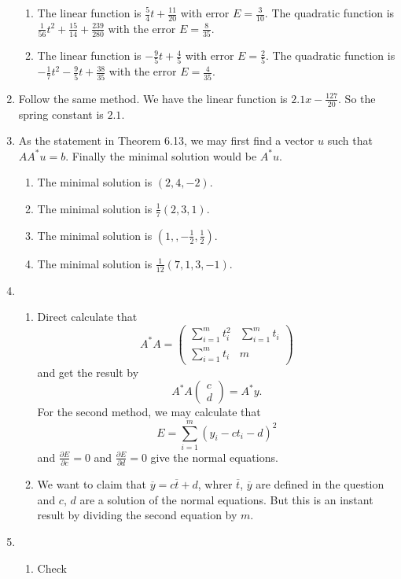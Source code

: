 \begin{enumerate}
\begin{enumerate}
\item The linear function is $\frac{5}{4}t+\frac{11}{20}$ with error $E=\frac{3}{10}$. The quadratic function is $\frac{1}{56}t^2+\frac{15}{14}+\frac{239}{280}$ with the error $E=\frac{8}{35}$.
\item The linear function is $-\frac{9}{5}t+\frac{4}{5}$ with error $E=\frac{2}{5}$. The quadratic function is $-\frac{1}{7}t^2-\frac{9}{5}t+\frac{38}{35}$ with the error $E=\frac{4}{35}$.
\end{enumerate}
\item Follow the same method. We have the linear function is $2.1x-\frac{127}{20}$. So the spring constant is $2.1$.
\item As the statement in Theorem 6.13, we may first find a vector $u$ such that $AA^*u=b$. Finally the minimal solution would be $A^*u$.
\begin{enumerate}
\item The minimal solution is $(2,4,-2)$.
\item The minimal solution is $\frac{1}{7}(2,3,1)$.
\item The minimal solution is $(1,,-\frac{1}{2},\frac{1}{2})$.
\item The minimal solution is $\frac{1}{12}(7,1,3,-1)$.
\end{enumerate}
\item \begin{enumerate}
\item Direct calculate that 
\[A^*A=\begin{pmatrix}\sum_{i=1}^m{t_i^2} &\sum_{i=1}^m{t_i}\\\sum_{i=1}^m{t_i} & m\end{pmatrix}\]
and get the result by 
\[A^*A\begin{pmatrix}c\\d\end{pmatrix}=A^*y.\]
For the second method, we may calculate that 
\[E=\sum_{i=1}^m{(y_i-ct_i-d)^2}\]
and $\frac{\partial E}{\partial c}=0$ and $\frac{\partial E}{\partial d}=0$ give the normal equations.
\item We want to claim that $\overline{y}=c\overline{t}+d$, whrer $\overline{t}$, $\overline{y}$ are defined in the question and $c$, $d$ are a solution of the normal equations. But this is an instant result by dividing the second equation by $m$.
\end{enumerate}
\item \begin{enumerate}
\item Check 

\end{enumerate}
\end{enumerate}

